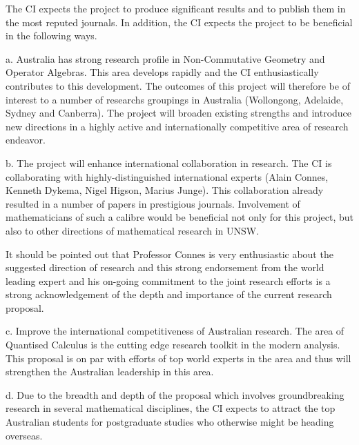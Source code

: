 \documentclass[12pt]{article}
\begin{document}
{\color{blue}The CI expects the project to produce significant results and to publish them in the most reputed journals. In addition, the CI expects the project to be beneficial in the following ways.

a. Australia has strong research profile in Non-Commutative Geometry and Operator Algebras. This area develops rapidly and the CI enthusiastically contributes to this development. The outcomes of this project will therefore be of interest to a number of researchs groupings in Australia (Wollongong, Adelaide, Sydney and Canberra). The project will broaden existing strengths and introduce new directions in a highly active and internationally competitive area of research endeavor. 





b. The project will enhance international collaboration in research. The CI is collaborating with highly-distinguished international experts (Alain Connes, Kenneth Dykema, Nigel Higson, Marius Junge). This collaboration already resulted in a number of papers in prestigious journals. Involvement of mathematicians of such a calibre would be beneficial not only for this project, but also to other directions of mathematical research in UNSW.

It should be pointed out that Professor Connes is very enthusiastic about the suggested direction of research and this strong endorsement from the world leading expert and his on-going commitment to the joint research efforts is a strong acknowledgement of the depth and importance of the current research proposal.

c. Improve the international competitiveness of Australian research. The area of Quantised Calculus is the cutting edge research toolkit in the modern analysis. This proposal is on par with efforts of top world experts in the area and thus will strengthen the Australian leadership in this area.

d. Due to the breadth and depth of the proposal which involves groundbreaking research in several mathematical disciplines, the CI expects to attract the top Australian students for postgraduate studies who otherwise might be heading overseas.}
\end{document}
